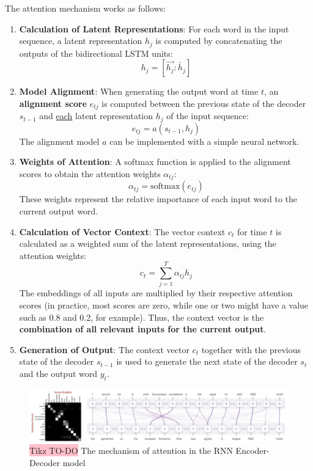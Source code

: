 The attention mechanism works as follows:
\begin{enumerate}
    \item \textbf{Calculation of Latent Representations}:
    For each word in the input sequence, a latent representation $h_j$ is computed by concatenating the outputs of the bidirectional LSTM units:
    $$
    h_j=\left[ \overrightarrow{h_j}:\overleftarrow{h_j} \right]
    $$
    
    \item \textbf{Model Alignment}:
    When generating the output word at time $t$, an \textbf{alignment score} $e_{tj}$ is computed between the previous state of the decoder $s_{t-1}$ and \underline{each} latent representation $h_j$ of the input sequence:
    $$
       e_{tj} = a(s_{t-1}, h_j)
    $$
    The alignment model $a$ can be implemented with a simple neural network.
    \vspace{0.25cm}
    
    \item \textbf{Weights of Attention}:
    A softmax function is applied to the alignment scores to obtain the attention weights $\alpha_{tj}$:
    $$
       \alpha_{tj} = \text{softmax}(e_{tj})
    $$
    These weights represent the relative importance of each input word to the current output word.
    \vspace{0.25cm}
    
    \item \textbf{Calculation of Vector Context}:
    The vector context $c_t$ for time $t$ is calculated as a weighted sum of the latent representations, using the attention weights:
    $$
       c_t = \sum_{j=1}^{T}\alpha_{tj}h_j
    $$
    The embeddings of all inputs are multiplied by their respective attention scores (in practice, most scores are zero, while one or two might have a value such as 0.8 and 0.2, for example). Thus, the context vector is the \textbf{combination of all relevant inputs for the current output}.
    \vspace{0.25cm}
    
    \item \textbf{Generation of Output}:
    The context vector $c_t$ together with the previous state of the decoder $s_{t-1}$ is used to generate the next state of the decoder $s_t$ and the output word $y_t$.
\end{enumerate}


\begin{figure}[!htbp]
    \centering
    \includegraphics[width=\linewidth]{tikz/chapter7 - Attention is Alignment.jpg}
    \caption{{\color{red}\colorbox{pink}{Tikz TO-DO}} The mechanism of attention in the RNN Encoder-Decoder model}
\end{figure}

